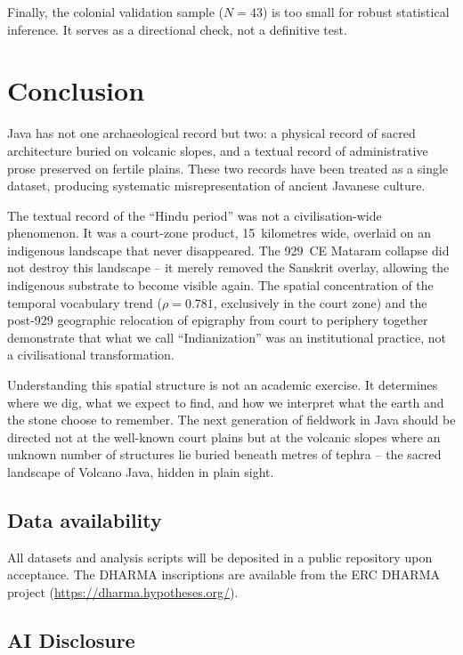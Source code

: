 \documentclass[12pt]{article}
\begin{document}
Finally, the colonial validation sample ($N = 43$) is too small for robust statistical inference.
It serves as a directional check, not a definitive test.


\section{Conclusion}

Java has not one archaeological record but two: a physical record of sacred architecture buried on volcanic slopes, and a textual record of administrative prose preserved on fertile plains.
These two records have been treated as a single dataset, producing systematic misrepresentation of ancient Javanese culture.

The textual record of the ``Hindu period'' was not a civilisation-wide phenomenon.
It was a court-zone product, 15~kilometres wide, overlaid on an indigenous landscape that never disappeared.
The 929~CE Mataram collapse did not destroy this landscape -- it merely removed the Sanskrit overlay, allowing the indigenous substrate to become visible again.
The spatial concentration of the temporal vocabulary trend ($\rho = 0.781$, exclusively in the court zone) and the post-929 geographic relocation of epigraphy from court to periphery together demonstrate that what we call ``Indianization'' was an institutional practice, not a civilisational transformation.

Understanding this spatial structure is not an academic exercise.
It determines where we dig, what we expect to find, and how we interpret what the earth and the stone choose to remember.
The next generation of fieldwork in Java should be directed not at the well-known court plains but at the volcanic slopes where an unknown number of structures lie buried beneath metres of tephra -- the sacred landscape of Volcano Java, hidden in plain sight.


\subsection*{Data availability}

All datasets and analysis scripts will be deposited in a public repository upon acceptance.
The DHARMA inscriptions are available from the ERC DHARMA project (\url{https://dharma.hypotheses.org/}).

\subsection*{AI Disclosure}
\end{document}
